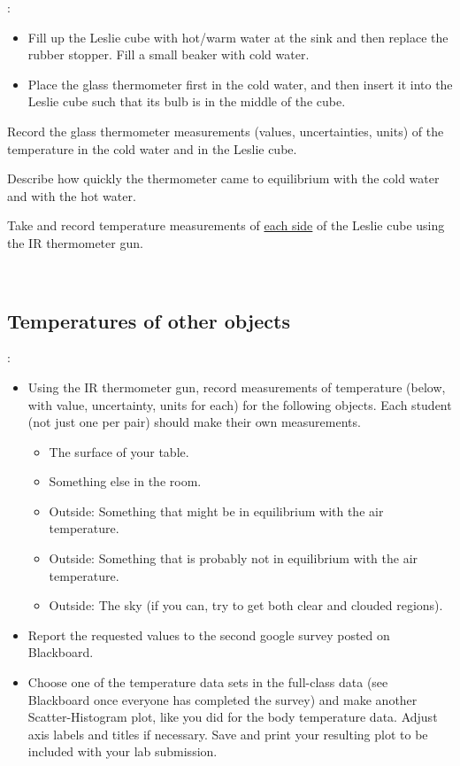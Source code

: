 :
\begin{itemize}
\item Fill up the Leslie cube with hot/warm water at the sink and then replace the rubber stopper. Fill a small beaker with cold water.
\item Place the glass thermometer first in the cold water, and then insert it into the Leslie cube such that its bulb is in the middle of the cube.
\end{itemize}
%

\noindent Record the glass thermometer measurements (values, uncertainties, units)  of the temperature in the cold water and in the Leslie cube.

\answerspace[2cm]

\noindent Describe how quickly the thermometer came to equilibrium with the cold water and with the hot water.

\answerspace[2cm]

\noindent Take and record temperature measurements of \underline{each side} of the Leslie cube using the IR thermometer gun. 


\answerspace[2cm]

\
\subsection{Temperatures of other objects}

:
\begin{itemize}
\item Using the IR thermometer gun, record measurements of temperature (below, with value, uncertainty, units for each) for the following objects. Each student (not just one per pair) should make their own measurements.
	\begin{itemize}
	\item The surface of your table.
	\item Something else in the room.
	\item Outside: Something that might be in equilibrium with the air temperature.
	\item Outside: Something that is probably not in equilibrium with the air temperature.
	\item Outside: The sky (if you can, try to get both clear and clouded regions).
	\end{itemize}
\item Report the requested values to the second google survey posted on Blackboard.
\item Choose one of the temperature data sets in the full-class data (see Blackboard once everyone has completed the survey) and make another Scatter-Histogram plot, like you did for the body temperature data.  Adjust axis labels and titles if necessary. Save and print your resulting plot to be included with your lab submission.
\end{itemize}


